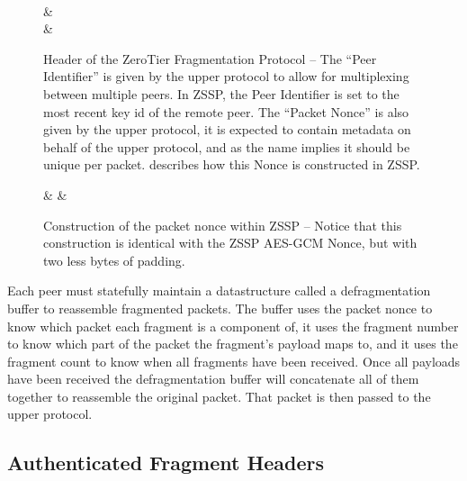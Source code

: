 \documentclass{article}
\begin{document}
\begin{figure}
	\caption{Header of the ZeroTier Fragmentation Protocol -- The ``Peer Identifier'' is given by the upper protocol to allow for multiplexing between multiple peers. In ZSSP, the Peer Identifier is set to the most recent key id of the remote peer. The ``Packet Nonce'' is also given by the upper protocol, it is expected to contain metadata on behalf of the upper protocol, and as the name implies it should be unique per packet.  describes how this Nonce is constructed in ZSSP.}\label{packet:header}
	\centering
	\begin{bytefield}[bitwidth=6.5em]{4}
		 \\
		 &  \\
		& 
	\end{bytefield}
\end{figure}

\begin{figure}
	\caption{Construction of the packet nonce within ZSSP -- Notice that this construction is identical with the ZSSP AES-GCM Nonce, but with two less bytes of padding.}\label{fig:header_nonce}
	\centering
	\begin{bytefield}[bitwidth=3.5em]{9}
		 & 
		& 
	\end{bytefield}
\end{figure}

Each peer must statefully maintain a datastructure called a defragmentation buffer to reassemble fragmented packets. The buffer uses the packet nonce to know which packet each fragment is a component of, it uses the fragment number to know which part of the packet the fragment's payload maps to, and it uses the fragment count to know when all fragments have been received. Once all payloads have been received the defragmentation buffer will concatenate all of them together to reassemble the original packet. That packet is then passed to the upper protocol.

\subsection{Authenticated Fragment Headers}\label{sec:header}
\end{document}
